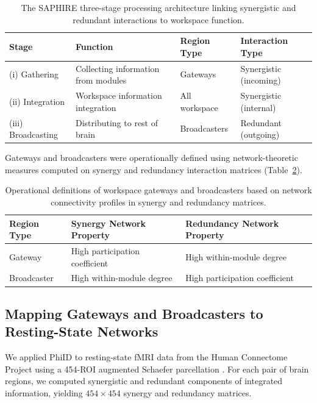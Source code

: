 \documentclass[11pt]{article}
\begin{document}
\begin{table}[H]
\centering
\caption{The SAPHIRE three-stage processing architecture linking synergistic and redundant interactions to workspace function.}
\label{tab:saphire}
\begin{tabular}{llll}
\toprule
\textbf{Stage} & \textbf{Function} & \textbf{Region Type} & \textbf{Interaction Type} \\
\midrule
(i) Gathering & Collecting information from modules & Gateways & Synergistic (incoming) \\
(ii) Integration & Workspace information integration & All workspace & Synergistic (internal) \\
(iii) Broadcasting & Distributing to rest of brain & Broadcasters & Redundant (outgoing) \\
\bottomrule
\end{tabular}
\end{table}

Gateways and broadcasters were operationally defined using network-theoretic measures computed on synergy and redundancy interaction matrices (Table~\ref{tab:definitions}).

\begin{table}[H]
\centering
\caption{Operational definitions of workspace gateways and broadcasters based on network connectivity profiles in synergy and redundancy matrices.}
\label{tab:definitions}
\begin{tabular}{lll}
\toprule
\textbf{Region Type} & \textbf{Synergy Network Property} & \textbf{Redundancy Network Property} \\
\midrule
Gateway & High participation coefficient & High within-module degree \\
Broadcaster & High within-module degree & High participation coefficient \\
\bottomrule
\end{tabular}
\end{table}

\subsection{Mapping Gateways and Broadcasters to Resting-State Networks}

We applied PhiID to resting-state fMRI data from the Human Connectome Project \citep{vanessen2013wuminn} using a 454-ROI augmented Schaefer parcellation \citep{schaefer2018local}. For each pair of brain regions, we computed synergistic and redundant components of integrated information, yielding $454 \times 454$ synergy and redundancy matrices.
\end{document}
